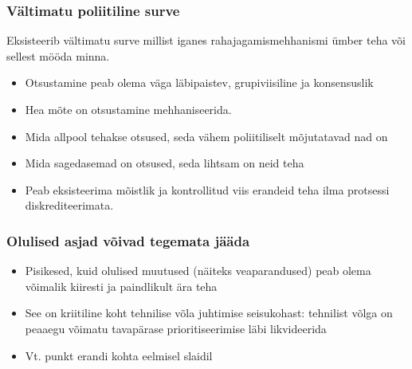 \begin{frame}[fragile]
  \frametitle{Vältimatu poliitiline surve}
  Eksisteerib vältimatu surve millist iganes rahajagamismehhanismi ümber teha või sellest mööda minna.
		\begin{itemize}
			\item Otsustamine peab olema väga läbipaistev, grupiviisiline ja konsensuslik
			\item Hea mõte on otsustamine mehhaniseerida. 
			\item Mida allpool tehakse otsused, seda vähem poliitiliselt mõjutatavad nad on
			\item Mida sagedasemad on otsused, seda lihtsam on neid teha 
			\item Peab eksisteerima mõistlik ja kontrollitud viis erandeid teha ilma protsessi diskrediteerimata. 
		\end{itemize}
\end{frame}

\begin{frame}[fragile]
  \frametitle{Olulised asjad võivad tegemata jääda}
		\begin{itemize}
			\item Pisikesed, kuid olulised muutused (näiteks veaparandused) peab olema võimalik kiiresti ja paindlikult ära teha
			\item See on kriitiline koht tehnilise võla juhtimise seisukohast: tehnilist võlga on peaaegu võimatu tavapärase prioritiseerimise läbi likvideerida 
			\item Vt. punkt erandi kohta eelmisel slaidil
		\end{itemize}
\end{frame}


